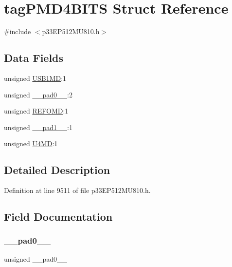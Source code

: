 \hypertarget{structtag_p_m_d4_b_i_t_s}{}\section{tag\+P\+M\+D4\+B\+I\+TS Struct Reference}
\label{structtag_p_m_d4_b_i_t_s}


{\ttfamily \#include $<$p33\+E\+P512\+M\+U810.\+h$>$}

\subsection*{Data Fields}
\begin{DoxyCompactItemize}
\item 
unsigned \hyperlink{structtag_p_m_d4_b_i_t_s_a65fdd03f46a7e952240a089e7bfae8ea}{U\+S\+B1\+MD}\+:1
\item 
unsigned \hyperlink{structtag_p_m_d4_b_i_t_s_adf71f3d8410c1f1dbbc96680a92c49af}{\+\_\+\+\_\+pad0\+\_\+\+\_\+}\+:2
\item 
unsigned \hyperlink{structtag_p_m_d4_b_i_t_s_a7600d448fc67d0fa1d5d65ec61fd66b4}{R\+E\+F\+O\+MD}\+:1
\item 
unsigned \hyperlink{structtag_p_m_d4_b_i_t_s_acaf2d0924a107ec6e8d2e31febaf66f9}{\+\_\+\+\_\+pad1\+\_\+\+\_\+}\+:1
\item 
unsigned \hyperlink{structtag_p_m_d4_b_i_t_s_a2a82eefcc5e92e851cc6b1f3e7947b3f}{U4\+MD}\+:1
\end{DoxyCompactItemize}


\subsection{Detailed Description}


Definition at line 9511 of file p33\+E\+P512\+M\+U810.\+h.



\subsection{Field Documentation}
\mbox{\label{structtag_p_m_d4_b_i_t_s_adf71f3d8410c1f1dbbc96680a92c49af}} 
\subsubsection{\texorpdfstring{\+\_\+\+\_\+pad0\+\_\+\+\_\+}{\_\_pad0\_\_}}
{\footnotesize\ttfamily unsigned \+\_\+\+\_\+pad0\+\_\+\+\_\+}



